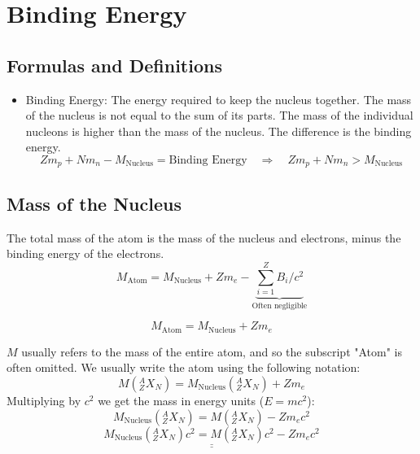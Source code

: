 \section{Binding Energy}
\subsection{Formulas and Definitions}
\begin{itemize}
    \item Binding Energy: The energy required to keep the nucleus together. The mass of the nucleus is not equal to the sum of its parts. The mass of the individual nucleons is higher than the mass of the nucleus. The difference is the binding energy.
    \begin{equation}
    Zm_p + Nm_n - M_{\text{Nucleus}} = \text{Binding Energy}  \quad ⇒ \quad Zm_p + Nm_n > M_{\text{Nucleus}}
    \end{equation}
\end{itemize}

\subsection{Mass of the Nucleus}
The total mass of the atom is the mass of the nucleus and electrons, minus the binding energy of the electrons. 
\begin{equation}
M_{\text{Atom}} = M_{\text{Nucleus}} + Zm_e - \underbrace{∑_{i=1}^{Z} B_i / c^2}_{\text{Often negligible}}
\end{equation}

\begin{equation}
M_{\text{Atom}} = M_{\text{Nucleus}} + Zm_e
\end{equation}

$M$ usually refers to the mass of the entire atom, and so the subscript "Atom" is often omitted. We usually write the atom using the following notation:
\begin{equation}
M\left(_{Z}^{A}X_{N}\right) = M_{\text{Nucleus}} \left(_{Z}^{A}X_{N}\right) + Zm_e
\end{equation}
Multiplying by $c^2$ we get the mass in energy units ($E = mc^2$):
\begin{equation}
M_{\text{Nucleus}}\left(_{Z}^{A}X_{N}\right) = M\left(_{Z}^{A}X_{N}\right) - Zm_ec^2
\end{equation}
\begin{equation}
\underline{\underline{M_{\text{Nucleus}}\left(_{Z}^{A}X_{N}\right)c^2 = M\left(_{Z}^{A}X_{N}\right)c^2 - Zm_e c^2 
}}
\end{equation}
